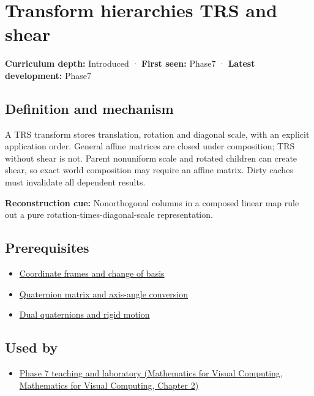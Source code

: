 \hypertarget{appendix-292c061cd47c}{}\label{referencestart:appendix-292c061cd47c}
\section{Transform hierarchies TRS and shear}\label{appendix-292c061cd47c-transform-hierarchies-trs-and-shear}

\textbf{Curriculum depth:} Introduced · \textbf{First seen:} Phase7 · \textbf{Latest development:} Phase7

\subsection{Definition and mechanism}\label{appendix-292c061cd47c-definition-and-mechanism}

A TRS transform stores translation, rotation and diagonal scale, with an explicit application order. General affine matrices are closed under composition; TRS without shear is not. Parent nonuniform scale and rotated children can create shear, so exact world composition may require an affine matrix. Dirty caches must invalidate all dependent results.

\textbf{Reconstruction cue:} Nonorthogonal columns in a composed linear map rule out a pure rotation-times-diagonal-scale representation.

\subsection{Prerequisites}\label{appendix-292c061cd47c-prerequisites}

\begin{itemize}
\tightlist
\item
  \hyperref[appendix-1bae9457dbc3]{Coordinate frames and change of basis}
\item
  \hyperref[appendix-26d8da71f6c4]{Quaternion matrix and axis-angle conversion}
\item
  \hyperref[appendix-d1ea57347893]{Dual quaternions and rigid motion}
\end{itemize}

\subsection{Used by}\label{appendix-292c061cd47c-used-by}

\begin{itemize}
\tightlist
\item
  \href{../02-Mathematics-for-Visual-Computing/main.pdf\#nameddest=01-foundations-i-ch018-keep-the-promises-visible-while-moving-between-representations}{Phase 7 teaching and laboratory (Mathematics for Visual Computing, Mathematics for Visual Computing, Chapter 2)}
\end{itemize}

